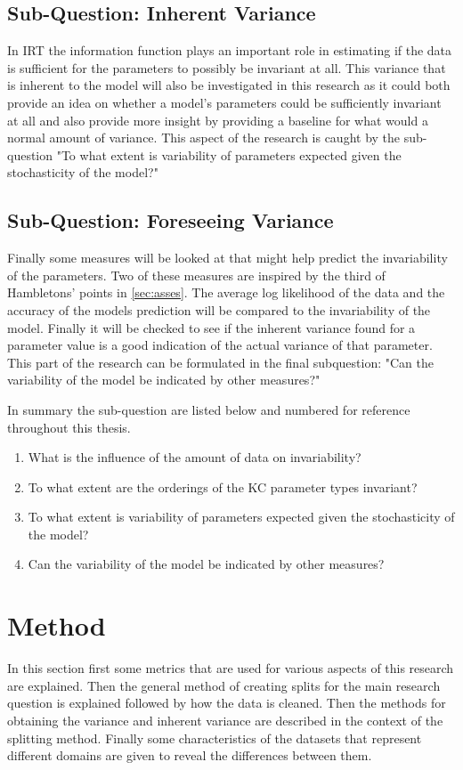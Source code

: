 \documentclass{scrartcl}
\begin{document}
\subsection{Sub-Question: Inherent Variance}
In IRT the information function plays an important role in estimating if the data is sufficient for the parameters to possibly be invariant at all. This variance that is inherent to the model will also be investigated in this research as it could both provide an idea on whether a model's parameters could be sufficiently invariant at all and also provide more insight by providing a baseline for what would a normal amount of variance. This aspect of the research is caught by the sub-question "To what extent is variability of parameters expected given the stochasticity of the model?"

\subsection{Sub-Question: Foreseeing Variance}
Finally some measures will be looked at that might help predict the invariability of the parameters. Two of these measures are inspired by the third of Hambletons' points in \ref{sec:asses}. The average log likelihood of the data and the accuracy of the models prediction will be compared to the invariability of the model. Finally it will be checked to see if the inherent variance found for a parameter value is a good indication of the actual variance of that parameter. This part of the research can be formulated in the final subquestion: "Can the variability of the model be indicated by other measures?"

In summary the sub-question are listed below and numbered for reference throughout this thesis.
\begin{enumerate}
  \item What is the influence of the amount of data on invariability?
  \item To what extent are the orderings of the KC parameter types invariant?
  \item To what extent is variability of parameters expected given the stochasticity of the model?
  \item Can the variability of the model be indicated by other measures?
\end{enumerate}

\section{Method}
In this section first some metrics that are used for various aspects of this research are explained. Then the general method of creating splits for the main research question is explained followed by how the data is cleaned. Then the methods for obtaining the variance and inherent variance are described in the context of the splitting method. Finally some characteristics of the datasets that represent different domains are given to reveal the differences between them.
\end{document}
